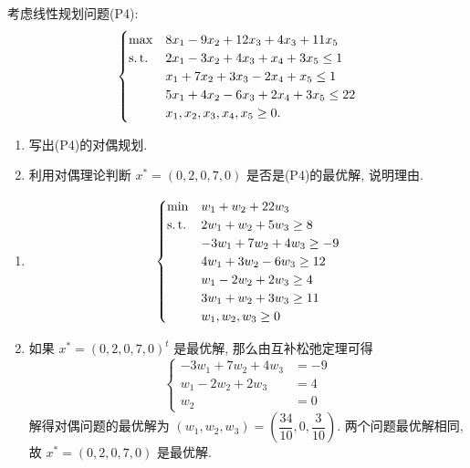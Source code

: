 \begin{Problem}
    考虑线性规划问题(P4):
    \[\begin{cases}
        \max & 8x_1 - 9x_2 + 12x_3 + 4x_3 + 11x_5\\
        \operatorname{s.t.} &2x_1 - 3x_2 + 4x_3 + x_4 + 3x_5 \le 1\\
        &x_1 + 7x_2 + 3x_3 - 2x_4 + x_5 \le 1\\
        &5x_1 + 4x_2 - 6x_3 + 2x_4 + 3x_5 \le 22\\
        &x_1, x_2, x_3, x_4, x_5 \ge 0\text{.}
    \end{cases}\]
    \begin{enumerate}
        \item 写出(P4)的对偶规划.
        \item 利用对偶理论判断 $x^* = (0, 2, 0, 7, 0)$ 是否是(P4)的最优解, 说明理由.
    \end{enumerate}

    \Answer \text{} \begin{enumerate}
        \item \[\begin{cases}
            \min &w_1 + w_2 + 22w_3\\
            \operatorname{s.t.} &2w_1 + w_2 + 5w_3 \ge 8\\
            &-3w_1 + 7w_2 + 4w_3 \ge -9\\
            &4w_1 + 3w_2 - 6w_3 \ge 12\\
            &w_1 - 2w_2 + 2w_3 \ge 4\\
            &3w_1 + w_2 + 3w_3 \ge 11\\
            &w_1, w_2, w_3 \ge 0
        \end{cases}\]
        \item 如果 $x^* = (0, 2, 0, 7, 0)^t$ 是最优解, 那么由互补松弛定理可得 
        \[\begin{cases}
            -3w_1 + 7w_2 + 4w_3 &= -9\\
            w_1 - 2w_2 + 2w_3 &= 4\\
            w_2 &= 0
        \end{cases}\]
        解得对偶问题的最优解为 $(w_1, w_2, w_3) = \left(\dfrac{34}{10}, 0, \dfrac{3}{10}\right)$. 两个问题最优解相同, 故 $x^* = (0, 2, 0, 7, 0)$ 是最优解.
    \end{enumerate}
\end{Problem}

